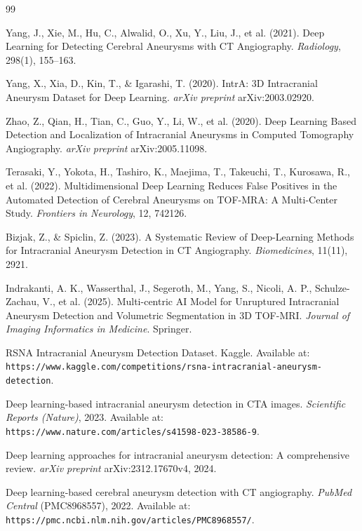 \documentclass[twoside,a4paper,openright]{report} %
\begin{document}
\begin{thebibliography}{99}

 Yang, J., Xie, M., Hu, C., Alwalid, O., Xu, Y., Liu, J., et al. (2021). Deep Learning for Detecting Cerebral Aneurysms with CT Angiography. \textit{Radiology}, 298(1), 155--163.

 Yang, X., Xia, D., Kin, T., \& Igarashi, T. (2020). IntrA: 3D Intracranial Aneurysm Dataset for Deep Learning. \textit{arXiv preprint} arXiv:2003.02920.

 Zhao, Z., Qian, H., Tian, C., Guo, Y., Li, W., et al. (2020). Deep Learning Based Detection and Localization of Intracranial Aneurysms in Computed Tomography Angiography. \textit{arXiv preprint} arXiv:2005.11098.

 Terasaki, Y., Yokota, H., Tashiro, K., Maejima, T., Takeuchi, T., Kurosawa, R., et al. (2022). Multidimensional Deep Learning Reduces False Positives in the Automated Detection of Cerebral Aneurysms on TOF-MRA: A Multi-Center Study. \textit{Frontiers in Neurology}, 12, 742126.

 Bizjak, Z., \& Spiclin, Z. (2023). A Systematic Review of Deep-Learning Methods for Intracranial Aneurysm Detection in CT Angiography. \textit{Biomedicines}, 11(11), 2921.

 Indrakanti, A. K., Wasserthal, J., Segeroth, M., Yang, S., Nicoli, A. P., Schulze-Zachau, V., et al. (2025). Multi-centric AI Model for Unruptured Intracranial Aneurysm Detection and Volumetric Segmentation in 3D TOF-MRI. \textit{Journal of Imaging Informatics in Medicine}. Springer.

 RSNA Intracranial Aneurysm Detection Dataset. Kaggle. Available at: \texttt{https://www.kaggle.com/competitions/rsna-intracranial-aneurysm-detection}.

 Deep learning-based intracranial aneurysm detection in CTA images. \textit{Scientific Reports (Nature)}, 2023. Available at: \texttt{https://www.nature.com/articles/s41598-023-38586-9}.

 Deep learning approaches for intracranial aneurysm detection: A comprehensive review. \textit{arXiv preprint} arXiv:2312.17670v4, 2024.

 Deep learning-based cerebral aneurysm detection with CT angiography. \textit{PubMed Central} (PMC8968557), 2022. Available at: \texttt{https://pmc.ncbi.nlm.nih.gov/articles/PMC8968557/}.

\end{thebibliography}
\end{document}
